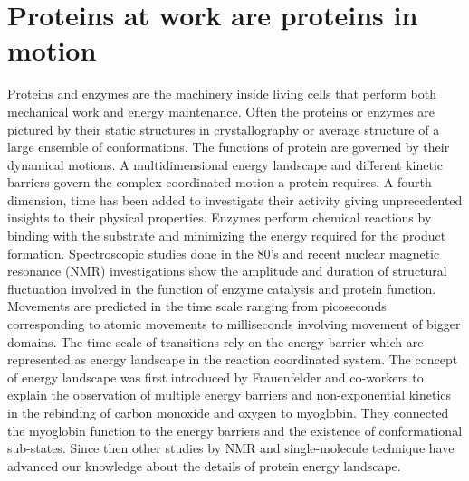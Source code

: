 \section{Proteins at work are  proteins in motion}
Proteins and enzymes are the machinery inside living cells that perform both mechanical work and energy maintenance.
Often the proteins or enzymes are pictured by their static structures in crystallography or average structure of a large ensemble of conformations.
The functions of protein are governed by their dynamical motions.
A multidimensional energy landscape and different kinetic barriers govern the complex coordinated motion a protein requires.
A fourth dimension, time has been added to investigate their activity giving unprecedented insights to their physical properties.
Enzymes perform chemical reactions by binding with the substrate and minimizing the energy required for the product formation.
Spectroscopic studies done in the 80's and recent nuclear magnetic resonance (NMR) investigations show the amplitude and duration of structural fluctuation involved in the function of enzyme catalysis and protein function.
Movements are predicted in the time scale ranging from picoseconds corresponding to atomic movements to milliseconds involving movement of bigger domains.\cite{henzler-wildman2007dynamic,frauenfelder1991the}
The time scale of transitions rely on the energy barrier which are represented as energy landscape in the reaction coordinated system.
The concept of energy landscape was first introduced by Frauenfelder and co-workers\cite{frauenfelder1991the} to explain the observation of multiple energy barriers and non-exponential kinetics in the rebinding of carbon monoxide and oxygen to myoglobin.
They connected the myoglobin function to the energy barriers and the existence of conformational sub-states.
Since then other studies by NMR and single-molecule technique have advanced our knowledge about the details of protein energy landscape.

